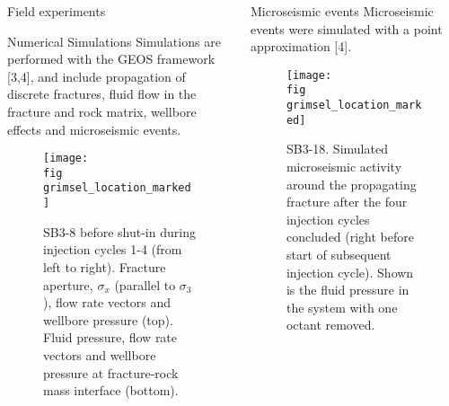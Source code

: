 \documentclass[final,t, 6pt]{beamer}
\begin{document}
\begin{frame}{}
\begin{columns}[t]
\begin{column}{.48\linewidth}
\begin{block}{Field experiments}
  \end{block}

  



  
  \begin{block}{Numerical Simulations}
    Simulations are performed with the \alert{GEOS framework} [3,4], and include propagation of discrete \alert{fractures}, \alert{fluid flow} in the fracture and rock matrix, \alert{wellbore effects} and \alert{microseismic events}. \\
    
    \begin{figure}
      \begin{center}
	\texttt{[image: \\fig grimsel\_location\_marked]}
      \end{center}
      \caption{SB3-8 before shut-in during injection cycles 1-4 (from left to right). 
	  Fracture aperture, $\sigma_x$ (parallel to $\sigma_3$), flow rate vectors and wellbore pressure (top). 
	  Fluid pressure, flow rate vectors and wellbore pressure at fracture-rock mass interface (bottom).}
    \end{figure} 
   
    
  \end{block}

\end{column}


  
  \begin{column}{.48\linewidth}
 
 
     \begin{block}{Microseismic events}
	\alert{Microseismic events} were simulated with a point approximation [4].
	\begin{figure}
	  \begin{center}
	    \texttt{[image: \\fig grimsel\_location\_marked]}
	    \caption{SB3-18. Simulated microseismic activity around the propagating fracture after the four injection cycles concluded (right before start of subsequent injection cycle). 
	    Shown is the fluid pressure in the system with one octant removed.}
	  \end{center} 
	\end{figure}
	

\end{block}
\end{column}
\end{columns}
\end{frame}
\end{document}
